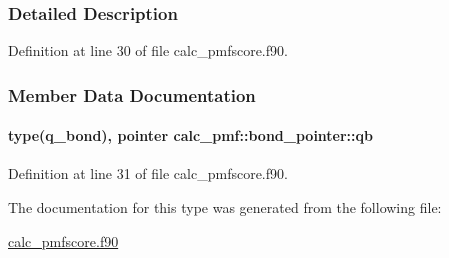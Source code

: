 \subsubsection{Detailed Description}


Definition at line 30 of file calc\-\_\-pmfscore.\-f90.



\subsubsection{Member Data Documentation}
\hypertarget{structcalc__pmf_1_1bond__pointer_a8ab7347a04f1d537a50e9162bc1e63ba}{
\paragraph[{qb}]{\setlength{\rightskip}{0pt plus 5cm}type({\bf q\-\_\-bond}), pointer calc\-\_\-pmf\-::bond\-\_\-pointer\-::qb}}\label{structcalc__pmf_1_1bond__pointer_a8ab7347a04f1d537a50e9162bc1e63ba}


Definition at line 31 of file calc\-\_\-pmfscore.\-f90.



The documentation for this type was generated from the following file\-:\begin{DoxyCompactItemize}
\item 
\hyperlink{calc__pmfscore_8f90}{calc\-\_\-pmfscore.\-f90}\end{DoxyCompactItemize}

